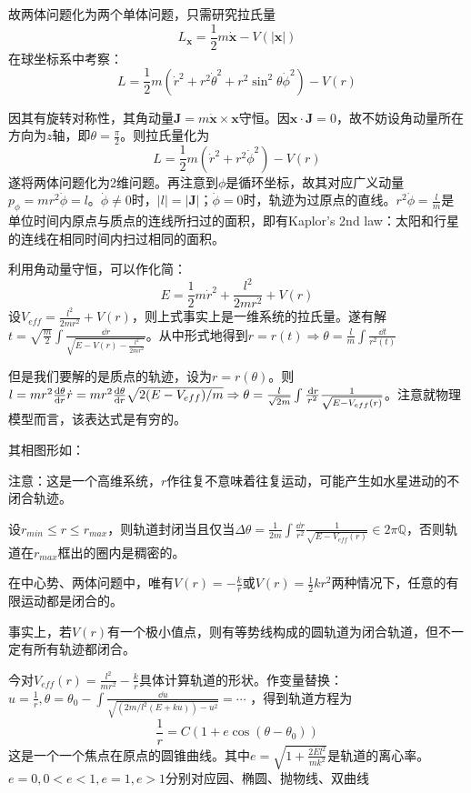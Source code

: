 \documentclass{ctexbook}
\begin{document}
故两体问题化为两个单体问题，只需研究拉氏量
\[L_{\bm x}=\frac{1}{2}m\dot{\bm{x}}-V(|\bm{x}|)\]
在球坐标系中考察：
\[L=\frac{1}{2}m(\dot r^{2}+r^{2}\dot{\theta}^{2}+r^{2}\sin^{2}\theta\dot{\phi}^{2})-V(r)\]

因其有旋转对称性，其角动量$\bm J=m\dot{\bm x}\times \bm x$守恒。因$\bm x\cdot \bm J=0$，故不妨设角动量所在方向为$z$轴，即$\theta=\frac{\pi}{2}$。则拉氏量化为
\[L=\frac{1}{2}m(\dot{r}^{2}+r^{2}\dot{\phi}^{2})-V(r)\]
遂将两体问题化为2维问题。再注意到$\phi$是循环坐标，故其对应广义动量$p_{\phi}=mr^{2}\dot{\phi}=l$。$\dot \phi\neq 0$时，$|l|=|\bm J|$；$\dot\phi=0$时，轨迹为过原点的直线。$r^{2}\dot{\phi}=\frac{l}{m}$是单位时间内原点与质点的连线所扫过的面积，即有Kaplor's 2nd law：太阳和行星的连线在相同时间内扫过相同的面积。

利用角动量守恒，可以作化简：
\[E=\frac{1}{2}m\dot{r}^{2}+\frac{l^{2}}{2mr^{2}}+V(r)\]
设$V_{eff}=\frac{l^{2}}{2mr^{2}}+V(r)$，则上式事实上是一维系统的拉氏量。遂有解$t=\sqrt{\frac m 2}\int\frac{\dd r}{\sqrt{E-V(r)-\frac{l^{2}}{2mr^{2}}}}$。从中形式地得到$r=r(t)\Rightarrow \theta=\frac{l}{m}\int\frac{\dd t}{r^{2}(t)}$

但是我们要解的是质点的轨迹，设为$r=r(\theta)$。则$l=mr^{2}\frac{\mathrm{d}\theta}{\mathrm{d}r}\dot r=mr^{2}\frac{\mathrm{d}\theta}{\mathrm{d}r}\sqrt{2(E-V_{eff})/m}\Rightarrow \theta=\frac{l}{\sqrt{2m}}\int\frac{\,\mathrm{d} r}{r^{2}}\frac{1}{\sqrt{E-V_{eff}(r)}}$。注意就物理模型而言，该表达式是有穷的。

其相图形如：

注意：这是一个高维系统，$r$作往复不意味着往复运动，可能产生如水星进动的不闭合轨迹。

设$r_{min}\leq r\leq r_{max}$，则轨道封闭当且仅当$\Delta\theta=\frac{1}{2m}\int \frac{\dd r}{r^{2}}\frac{1}{\sqrt{E-V_{eff}(r)}}\in 2\pi\mathbb{Q}$，否则轨道在$r_{max}$框出的圈内是稠密的。

\begin{Thm}[伯特兰定理]
  在中心势、两体问题中，唯有$V(r)=-\frac{k}{r}$或$V(r)=\frac{1}{2}kr^{2}$两种情况下，任意的有限运动都是闭合的。
\end{Thm}

事实上，若$V(r)$有一个极小值点，则有等势线构成的圆轨道为闭合轨道，但不一定有所有轨迹都闭合。

今对$V_{eff}(r)=\frac{l^{2}}{mr^{2}}-\frac{k}{r}$具体计算轨道的形状。作变量替换：$u=\frac{1}{r}, \theta=\theta_{0}-\int\frac{\dd u}{\sqrt{(2m/l^{2}(E+ku))-u^{2}}}=\cdots$%
，得到轨道方程为
\[\frac{1}{r}=C(1+e\cos(\theta-\theta_{0}))\]
这是一个一个焦点在原点的圆锥曲线。其中$e=\sqrt{1+\frac{2El^{2}}{mk^{2}}}$是轨道的离心率。$e=0,0<e<1,e=1,e>1$分别对应园、椭圆、抛物线、双曲线
\end{document}
